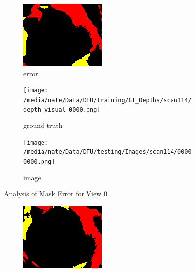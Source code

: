 \documentclass{article}
\begin{document}
\begin{figure}
	\centering
	\begin{subfigure}{0.3\textwidth}
		\centering
		\includegraphics[width=\textwidth]{./output/000_error.png}
		\caption{error}
		\label{fig:error0}
	\end{subfigure}
	\hfill
	\centering
	\begin{subfigure}{0.3\textwidth}
		\centering
		\texttt{[image: /media/nate/Data/DTU/training/GT\_Depths/scan114/depth\_visual\_0000.png]}
		\caption{ground truth}
		\label{fig:gt0}
	\end{subfigure}
	\hfill
	\centering
	\begin{subfigure}{0.3\textwidth}
		\centering
		\texttt{[image: /media/nate/Data/DTU/testing/Images/scan114/00000000.png]}
		\caption{image}
		\label{fig:img0}
	\end{subfigure}
	\hfill
	\caption{Analysis of Mask Error for View 0}
	\label{fig:error_analys0}
\end{figure}\begin{figure}
	\centering
	\begin{subfigure}{0.3\textwidth}
		\centering
		\includegraphics[width=\textwidth]{./output/001_error.png}

\end{subfigure}
\end{figure}
\end{document}
